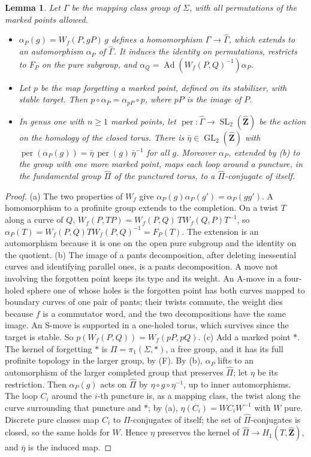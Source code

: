 \documentclass[11pt,a4paper]{article}
\theoremstyle{plain}
\newtheorem{lemma}[theorem]{Lemma}
\theoremstyle{definition}
\theoremstyle{remark}
\newcommand{\Zh}{\widehat{\mathbf Z}}
\newcommand{\Ad}{\operatorname{Ad}}
\newcommand{\SL}{\operatorname{SL}}
\newcommand{\GL}{\operatorname{GL}}
\newcommand{\per}{\operatorname{per}}
\begin{document}
\begin{lemma}\label{lem:mixed}
Let $\Gamma$ be the mapping class group of $\Sigma$, with all permutations of the marked points allowed.
\begin{itemize}
\item[(a)] $\alpha_P(g)=W_f(P,gP)\,g$ defines a homomorphism $\Gamma\to\widehat\Gamma$, which extends to an
automorphism $\alpha_P$ of $\widehat\Gamma$. It induces the identity on permutations, restricts to $F_P$ on the
pure subgroup, and $\alpha_Q=\Ad(W_f(P,Q)^{-1})\alpha_P$.
\item[(b)] Let $p$ be the map forgetting a marked point, defined on its stabilizer, with stable target. Then
$p\circ\alpha_P=\alpha_{pP}\circ p$, where $pP$ is the image of $P$.
\item[(c)] In genus one with $n\ge1$ marked points, let $\per:\widehat\Gamma\to\SL_2(\Zh)$ be the action on the
homology of the closed torus. There is $\bar\eta\in\GL_2(\Zh)$ with
$\per(\alpha_P(g))=\bar\eta\,\per(g)\,\bar\eta^{-1}$ for all $g$. Moreover $\alpha_P$, extended by \textup{(b)} to
the group with one more marked point, maps each loop around a puncture, in the fundamental group $\widehat\Pi$ of
the punctured torus, to a $\widehat\Pi$-conjugate of itself.
\end{itemize}
\end{lemma}

\begin{proof}
(a) The two properties of $W_f$ give $\alpha_P(g)\alpha_P(g')=\alpha_P(gg')$. A homomorphism to a profinite
group extends to the completion. On a twist $T$ along a curve of $Q$, $W_f(P,TP)=W_f(P,Q)\,TW_f(Q,P)T^{-1}$, so
$\alpha_P(T)=W_f(P,Q)TW_f(P,Q)^{-1}=F_P(T)$. The extension is an automorphism because it is one on the open pure
subgroup \cite[Theorem 4]{HLS} and the identity on the quotient. (b) The image of a pants decomposition, after
deleting inessential curves and identifying parallel ones, is a pants decomposition. A move not involving the
forgotten point keeps its type and its weight. An A-move in a four-holed sphere one of whose holes is the
forgotten point has both curves mapped to boundary curves of one pair of pants; their twists commute, the weight
dies because $f$ is a commutator word, and the two decompositions have the same image. An S-move is supported in a
one-holed torus, which survives since the target is stable. So $p(W_f(P,Q))=W_f(pP,pQ)$. (c) Add a marked
point $*$. The kernel of forgetting $*$ is $\Pi=\pi_1(\Sigma,*)$, a free group, and it has its full profinite
topology in the larger group, by (F). By (b), $\alpha_P$ lifts to an automorphism of the larger completed group
that preserves $\widehat\Pi$; let $\eta$ be its restriction. Then $\alpha_P(g)$ acts on $\widehat\Pi$ by
$\eta\circ g\circ\eta^{-1}$, up to inner automorphisms. The loop $C_i$ around the $i$-th puncture is, as a mapping
class, the twist along the curve surrounding that puncture and $*$; by (a), $\eta(C_i)=WC_iW^{-1}$ with $W$ pure.
Discrete pure classes map $C_i$ to $\Pi$-conjugates of itself; the set of $\widehat\Pi$-conjugates is closed, so
the same holds for $W$. Hence $\eta$ preserves the kernel of $\widehat\Pi\to H_1(T,\Zh)$, and $\bar\eta$ is the
induced map.
\end{proof}
\end{document}

